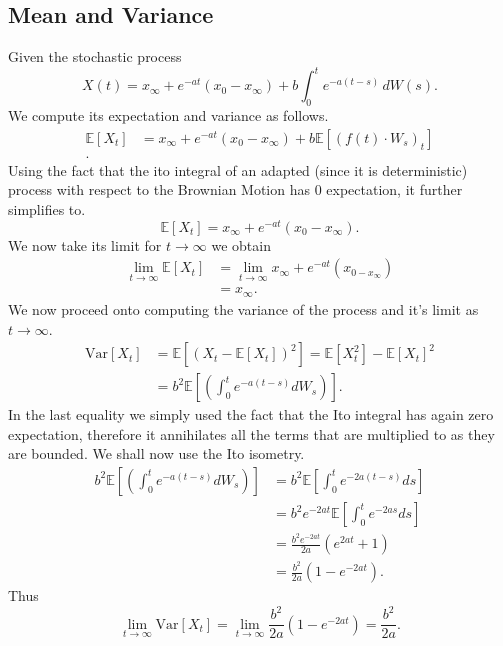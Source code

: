 \documentclass[a4paper,12pt]{article} %
\newcommand{\Var}{\mathrm{Var}}
\begin{document}
\subsection{Mean and Variance}
Given the stochastic process
\begin{equation}
    X(t) = x_{\infty} + e^{-at} (x_0 - x_{\infty}) + b \int_0^t e^{-a(t-s)} \, dW(s).
\end{equation}
We compute its expectation and variance as follows.
\begin{align*}
    \mathbb{E} \left[ X_t \right] & = x_\infty + e^{-at}(x_0 - x_\infty ) + b \mathbb{E} \left[ (f(t) \cdot W_s)_t \right] \\.
\end{align*}
Using the fact that the ito integral of an adapted (since it is deterministic) process with respect to the Brownian Motion has 0 expectation, it further simplifies to.
\begin{equation}
    \mathbb{E} \left[ X_t \right]  = x_\infty  + e^{-at}(x_0 -x_\infty ).
\end{equation}
We now take its limit for \(t\to \infty \) we obtain
\begin{align*}
    \lim_{t \to \infty} \mathbb{E} \left[ X_t \right] & = \lim_{t \to \infty} x_\infty + e^{-at}(x_{0- x_\infty } ) \\
                                                      & = x_\infty .
\end{align*}
We now proceed onto computing the variance of the process and it's limit as \(t\to \infty \).
\begin{align*}
    \Var\left[X_t \right] & = \mathbb{E} \left[ (X_t - \mathbb{E} \left[ X_t \right])^2 \right]  = \mathbb{E} \left[ X_{t} ^{2}  \right] - \mathbb{E} \left[ X_t \right]^{2} \\
                          & = b^2 \mathbb{E} \left[ \left( \int _0^t e^{-a(t-s)}dW_s \right)  \right].
\end{align*}
In the last equality we simply used the fact that the Ito integral has again zero expectation, therefore it annihilates all the terms that are multiplied to as they are bounded. We shall now use the Ito isometry.
\begin{align*}
    b^2 \mathbb{E} \left[ \left( \int _0^t e^{-a(t-s)}dW_s \right)  \right] & = b^{2} \mathbb{E} \left[ \int _0^t e^{-2a(t-s)}ds \right]   \\
                                                                            & = b^2 e^{-2at}\mathbb{E} \left[ \int _0^t e^{-2as}ds \right] \\
                                                                            & = \frac{b^{2} e^{-2at}}{2a}(e^{2at}+1)                       \\
                                                                            & = \frac{b^{2} }{2a}(1- e^{-2at}).
\end{align*}
Thus
\begin{equation}
    \lim_{t \to \infty}  \Var\left[X_t \right] = \lim_{t \to \infty}\frac{b^{2} }{2a}(1- e^{-2at})  = \frac{b^{2} }{2a}.
\end{equation}
\end{document}
